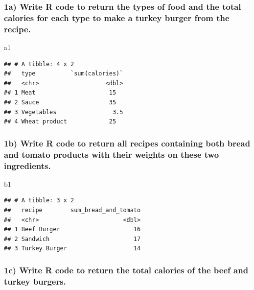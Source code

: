\documentclass[
]{article}
\newenvironment{Shaded}{\begin{snugshade}}{\end{snugshade}}
\newcommand{\NormalTok}[1]{#1}
\begin{document}
\subsubsection{1a) Write R code to return the types of food and the
total calories for each type to make a turkey burger from the
recipe.}\label{a-write-r-code-to-return-the-types-of-food-and-the-total-calories-for-each-type-to-make-a-turkey-burger-from-the-recipe.}

\begin{Shaded}
\begin{Highlighting}[]
\NormalTok{a1}
\end{Highlighting}
\end{Shaded}

\begin{verbatim}
## # A tibble: 4 x 2
##   type          `sum(calories)`
##   <chr>                   <dbl>
## 1 Meat                     15  
## 2 Sauce                    35  
## 3 Vegetables                3.5
## 4 Wheat product            25
\end{verbatim}

\subsubsection{1b) Write R code to return all recipes containing both
bread and tomato products with their weights on these two
ingredients.}\label{b-write-r-code-to-return-all-recipes-containing-both-bread-and-tomato-products-with-their-weights-on-these-two-ingredients.}

\begin{Shaded}
\begin{Highlighting}[]
\NormalTok{b1}
\end{Highlighting}
\end{Shaded}

\begin{verbatim}
## # A tibble: 3 x 2
##   recipe        sum_bread_and_tomato
##   <chr>                        <dbl>
## 1 Beef Burger                     16
## 2 Sandwich                        17
## 3 Turkey Burger                   14
\end{verbatim}

\subsubsection{1c) Write R code to return the total calories of the beef
and turkey
burgers.}\label{c-write-r-code-to-return-the-total-calories-of-the-beef-and-turkey-burgers.}
\end{document}
